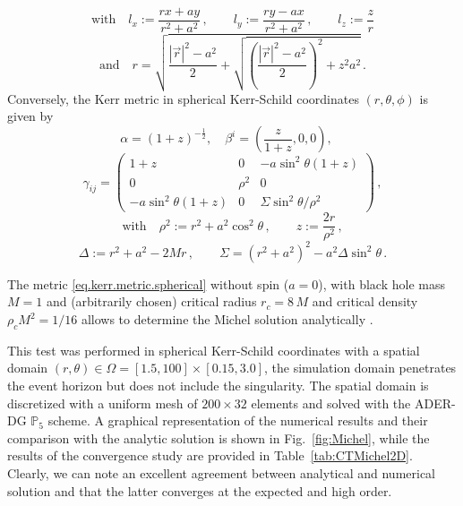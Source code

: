 \begin{equation}
\text{with}\quad
  l_x := \frac{r x + a y}{r^2 + a^2}\,, \qquad l_y := \frac{r y - a
    x}{r^2 + a^2}\,, \qquad l_z := \frac{z}{r}
\end{equation}
\begin{equation}
\text{and}\quad
  r =
  \sqrt{ \frac{|\vec r|^2 - a^2}{2} + \sqrt{\left(\frac{|\vec r|^2 -
      a^2}{2}\right)^2 + z^2 a^2} }\,.
\end{equation}
%
Conversely, the Kerr metric in {spherical} Kerr-Schild coordinates
$(r,\theta,\phi)$ is given by \citep{Komissarov04}
%
\begin{equation}
  \alpha = (1+z)^{-\frac{1}{2}}, \quad \beta^i = \left( \frac{z}{1+z},0,0
  \right) , \quad
\end{equation}
\begin{equation}
	\gamma_{ij} = \left( \begin{array}{ccc} 1 + z & 0 & - a \sin^2
          \theta (1 + z) \\ 0 & \rho^2 & 0 \\ - a \sin^2 \theta (1 + z) &
          0 & {\Sigma} \sin^2 \theta/{\rho^2}
	\end{array} \right)\,,
	\label{eq.kerr.metric.spherical}
\end{equation}
\begin{equation}
  \text{with}\quad
	 \rho^2 := r^2 + a^2 \cos^2 \theta\,, \qquad z := \frac{2 r}{\rho^2}\,,
\end{equation}
\begin{equation} 
	\Delta := r^2 + a^2 - 2 M r\,, \qquad \Sigma = (r^2 + a^2)^2 - a^2
        \Delta \sin^2 \theta\,.
\end{equation}

The metric \eqref{eq.kerr.metric.spherical} without spin ($a=0$), with
black hole mass $M=1$ and (arbitrarily chosen) critical radius $r_c=8\,M$
and critical density $\rho_c M^2=1/16$ allows to determine the Michel solution
analytically \cite{Rezzolla_book:2013}.

This test was performed in spherical Kerr-Schild coordinates with a spatial
domain $(r,\theta)\in\Omega=[1.5,100]\times[0.15, 3.0]$, \ie the simulation
domain penetrates the event horizon but does not include the singularity.
The spatial domain is discretized with a uniform mesh of $200\times 32$ elements
and solved with the ADER-DG $\mathbb{P}_5$ scheme. A graphical representation
of the numerical results and their comparison with the analytic solution is
shown in Fig.~\ref{fig:Michel}, while the results of the convergence study are
provided in Table~\ref{tab:CTMichel2D}. Clearly, we can note an
excellent agreement between analytical and numerical solution and that
the latter converges at the expected and high order.

